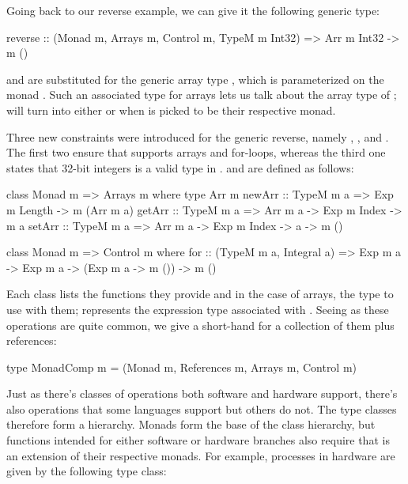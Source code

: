 \documentclass[../paper.tex]{subfiles}
\begin{document}
Going back to our reverse example, we can give it the following generic type:

\begin{code}
reverse :: (Monad m, Arrays m, Control m, TypeM m Int32)
        => Arr m Int32 -> m ()
\end{code}

\noindent {} and  are substituted for the generic array type , which is parameterized on the monad . Such an associated type for arrays lets us talk about the array type of ;  will turn into either  or  when  is picked to be their respective monad.

Three new constraints were introduced for the generic reverse, namely , , and . The first two ensure that  supports arrays and for-loops, whereas the third one states that 32-bit integers is a valid type in .  and  are defined as follows:

\begin{code}
class Monad m => Arrays m where
  type Arr m
  newArr :: TypeM m a => Exp m Length -> m (Arr m a)
  getArr :: TypeM m a => Arr m a -> Exp m Index -> m a
  setArr :: TypeM m a => Arr m a -> Exp m Index -> a -> m ()

class Monad m => Control m where
  for :: (TypeM m a, Integral a) => Exp m a -> Exp m a -> (Exp m a -> m ())
      -> m ()
\end{code}

\noindent Each class lists the functions they provide and in the case of arrays, the type to use with them;  represents the expression type associated with . Seeing as these operations are quite common, we give a short-hand for a collection of them plus references:

\begin{code}
type MonadComp m = (Monad m, References m, Arrays m, Control m)
\end{code}

Just as there's classes of operations both software and hardware support, there's also operations that some languages support but others do not. The type classes therefore form a hierarchy. Monads form the base of the class hierarchy, but functions intended for either software or hardware branches also require that  is an extension of their respective monads. For example, processes in hardware are given by the following type class:
\end{document}
